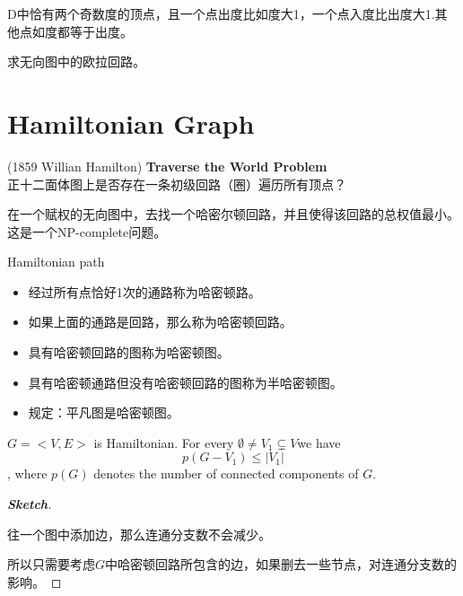 \documentclass[11pt,fleqn]{book} %
\begin{document}
\begin{CJK}{UTF8}{gkai}
\begin{theorem}
    [有向半欧拉图的判定]
    D中恰有两个奇数度的顶点，且一个点出度比如度大1，一个点入度比出度大1.其他点如度都等于出度。
\end{theorem}

\begin{definition}
    求无向图中的欧拉回路。
\end{definition}

\begin{definition}
    [逐步插入回路算法]
\end{definition}

\section{Hamiltonian Graph}
\begin{proposition}
    [motive] (1859 Willian Hamilton) \textbf{Traverse the World Problem} \\
    正十二面体图上是否存在一条初级回路（圈）遍历所有顶点？
\end{proposition}
\begin{remark}
     在一个赋权的无向图中，去找一个哈密尔顿回路，并且使得该回路的总权值最小。\\
    这是一个NP-complete问题。

\end{remark}

\begin{definition}
    Hamiltonian path \\
    \begin{itemize}
        \item 经过所有点恰好1次的通路称为哈密顿路。
        \item 如果上面的通路是回路，那么称为哈密顿回路。
        \item 具有哈密顿回路的图称为哈密顿图。
        \item 具有哈密顿通路但没有哈密顿回路的图称为半哈密顿图。
        \item 规定：平凡图是哈密顿图。
    \end{itemize}
\end{definition}

\begin{theorem}
    $G = < V, E>$ is Hamiltonian. For every $\emptyset \neq V_1 \subsetneq{V}$we have
    \[
        p(G - V_1) \leq |V_1| \], where $p(G)$ denotes the number of connected components of $G$.
\end{theorem}
\begin{proof}
    [\textbf{Sketch}]
    \begin{fact}
        往一个图中添加边，那么连通分支数不会减少。
    \end{fact}
    所以只需要考虑$G$中哈密顿回路所包含的边，如果删去一些节点，对连通分支数的影响。
\end{proof}


\end{CJK}
\end{document}
